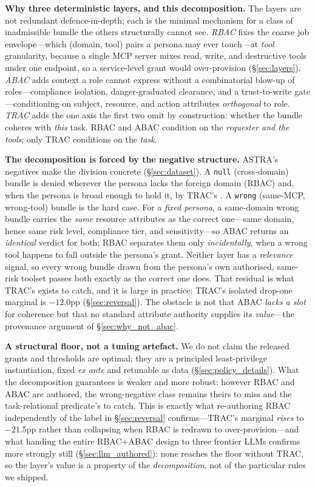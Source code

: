 \documentclass[sigconf,review,anonymous]{acmart}
\begin{document}
\textbf{Why three deterministic layers, and this decomposition.} The layers are not redundant defence-in-depth; each is the minimal mechanism for a class of inadmissible bundle the others structurally cannot see. \emph{RBAC} fixes the coarse job envelope---which (domain, tool) pairs a persona may ever touch---at \emph{tool} granularity, because a single MCP server mixes read, write, and destructive tools under one endpoint, so a service-level grant would over-provision (\S\ref{sec:layers}). \emph{ABAC} adds context a role cannot express without a combinatorial blow-up of roles---compliance isolation, danger-graduated clearance, and a trust-to-write gate---conditioning on subject, resource, and action attributes \emph{orthogonal} to role. \emph{TRAC} adds the one axis the first two omit by construction: whether the bundle coheres with \emph{this} task. RBAC and ABAC condition on the \emph{requester and the tools}; only TRAC conditions on the \emph{task}.

\textbf{The decomposition is forced by the negative structure.} ASTRA's negatives make the division concrete (\S\ref{sec:dataset}). A \texttt{null} (cross-domain) bundle is denied wherever the persona lacks the foreign domain (RBAC) and, when the persona is broad enough to hold it, by TRAC's . A \texttt{wrong} (same-MCP, wrong-tool) bundle is the hard case. For a \emph{fixed persona}, a same-domain wrong bundle carries the \emph{same} resource attributes as the correct one---same domain, hence same risk level, compliance tier, and sensitivity---so ABAC returns an \emph{identical} verdict for both; RBAC separates them only \emph{incidentally}, when a wrong tool happens to fall outside the persona's grant. Neither layer has a \emph{relevance} signal, so every wrong bundle drawn from the persona's own authorised, same-risk toolset passes both exactly as the correct one does. That residual is what TRAC's  exists to catch, and it is large in practice: TRAC's isolated drop-one marginal is $-12.0$pp (\S\ref{sec:reversal}). The obstacle is not that ABAC \emph{lacks a slot} for coherence but that no standard attribute authority supplies its \emph{value}---the provenance argument of \S\ref{sec:why_not_abac}.

\textbf{A structural floor, not a tuning artefact.} We do not claim the released grants and thresholds are optimal; they are a principled least-privilege instantiation, fixed \emph{ex ante} and retunable as data (\S\ref{sec:policy_details}). What the decomposition guarantees is weaker and more robust: however RBAC and ABAC are authored, the wrong-negative class remains theirs to miss and the task-relational predicate's to catch. This is exactly what re-authoring RBAC independently of the label in \S\ref{sec:reversal} confirms---TRAC's marginal \emph{rises} to $-21.5$pp rather than collapsing when RBAC is redrawn to over-provision---and what handing the entire RBAC$+$ABAC design to three frontier LLMs confirms more strongly still (\S\ref{sec:llm_authored}): none reaches the floor without TRAC, so the layer's value is a property of the \emph{decomposition}, not of the particular rules we shipped.
\end{document}

